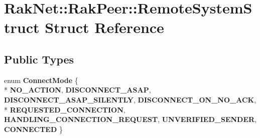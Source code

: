 \hypertarget{struct_rak_net_1_1_rak_peer_1_1_remote_system_struct}{\section{Rak\-Net\-:\-:Rak\-Peer\-:\-:Remote\-System\-Struct Struct Reference}
\label{struct_rak_net_1_1_rak_peer_1_1_remote_system_struct}
}
\subsection*{Public Types}
\begin{DoxyCompactItemize}
\item 
enum {\bfseries Connect\-Mode} \{ \\*
{\bfseries N\-O\-\_\-\-A\-C\-T\-I\-O\-N}, 
{\bfseries D\-I\-S\-C\-O\-N\-N\-E\-C\-T\-\_\-\-A\-S\-A\-P}, 
{\bfseries D\-I\-S\-C\-O\-N\-N\-E\-C\-T\-\_\-\-A\-S\-A\-P\-\_\-\-S\-I\-L\-E\-N\-T\-L\-Y}, 
{\bfseries D\-I\-S\-C\-O\-N\-N\-E\-C\-T\-\_\-\-O\-N\-\_\-\-N\-O\-\_\-\-A\-C\-K}, 
\\*
{\bfseries R\-E\-Q\-U\-E\-S\-T\-E\-D\-\_\-\-C\-O\-N\-N\-E\-C\-T\-I\-O\-N}, 
{\bfseries H\-A\-N\-D\-L\-I\-N\-G\-\_\-\-C\-O\-N\-N\-E\-C\-T\-I\-O\-N\-\_\-\-R\-E\-Q\-U\-E\-S\-T}, 
{\bfseries U\-N\-V\-E\-R\-I\-F\-I\-E\-D\-\_\-\-S\-E\-N\-D\-E\-R}, 
{\bfseries C\-O\-N\-N\-E\-C\-T\-E\-D}
 \}
\end{DoxyCompactItemize}
